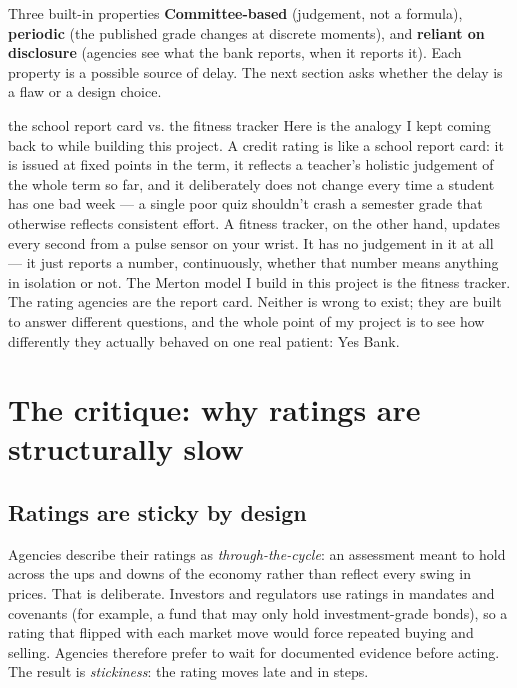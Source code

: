 \begin{keybox}{Three built-in properties}
\textbf{Committee-based} (judgement, not a formula), \textbf{periodic} (the published grade changes at discrete moments), and \textbf{reliant on disclosure} (agencies see what the bank reports, when it reports it). Each property is a possible source of delay. The next section asks whether the delay is a flaw or a design choice.
\end{keybox}

\begin{defbox}{the school report card vs. the fitness tracker}
Here is the analogy I kept coming back to while building this project. A credit rating is like a school report card: it is issued at fixed points in the term, it reflects a teacher's holistic judgement of the whole term so far, and it deliberately does not change every time a student has one bad week — a single poor quiz shouldn't crash a semester grade that otherwise reflects consistent effort. A fitness tracker, on the other hand, updates every second from a pulse sensor on your wrist. It has no judgement in it at all — it just reports a number, continuously, whether that number means anything in isolation or not. The Merton model I build in this project is the fitness tracker. The rating agencies are the report card. Neither is wrong to exist; they are built to answer different questions, and the whole point of my project is to see how differently they actually behaved on one real patient: Yes Bank.
\end{defbox}

\section{The critique: why ratings are structurally slow}
\label{sec:critique}

\subsection{Ratings are sticky by design}
Agencies describe their ratings as \emph{through-the-cycle}: an assessment meant to hold across the ups and downs of the economy rather than reflect every swing in prices. That is deliberate. Investors and regulators use ratings in mandates and covenants (for example, a fund that may only hold investment-grade bonds), so a rating that flipped with each market move would force repeated buying and selling. Agencies therefore prefer to wait for documented evidence before acting. The result is \emph{stickiness}: the rating moves late and in steps.


